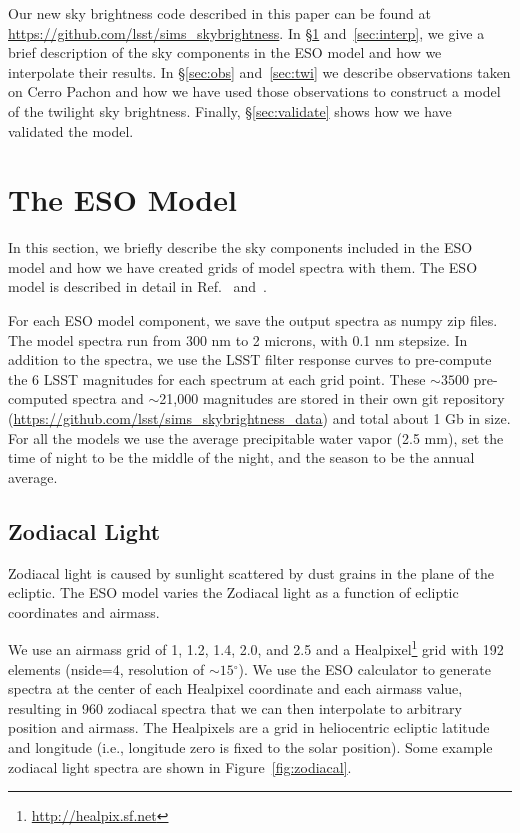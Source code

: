 \documentclass[]{spie}
\newcommand\degree{{^\circ}}
\begin{document}
Our new sky brightness code described in this paper can be found at \url{https://github.com/lsst/sims\_skybrightness}. In \S\ref{sec:eso} and~\ref{sec:interp}, we give a brief description of the sky components in the ESO model and how we interpolate their results. In \S\ref{sec:obs} and~\ref{sec:twi} we describe observations taken on Cerro Pachon and how we have used those observations to construct a model of the twilight sky brightness.  Finally, \S\ref{sec:validate} shows how we have validated the model.

\section{The ESO Model}\label{sec:eso}

In this section, we briefly describe the sky components included in the ESO model and how we have created grids of model spectra with them. The ESO model is described in detail in Ref.~ and~.

For each ESO model component, we save the output spectra as numpy zip files.  The model spectra run from 300 nm to 2 microns, with 0.1 nm stepsize.  In addition to the spectra, we use the LSST filter response curves to pre-compute the 6 LSST magnitudes for each spectrum at each grid point. These $\sim3500$ pre-computed spectra and $\sim$21,000 magnitudes are stored in their own git repository (\url{https://github.com/lsst/sims\_skybrightness\_data}) and total about 1 Gb in size. For all the models we use the average precipitable water vapor (2.5 mm), set the time of night to be the middle of the night, and the season to be the annual average.

\subsection{Zodiacal Light}

Zodiacal light is caused by sunlight scattered by dust grains in the plane of the ecliptic.  The ESO model varies the Zodiacal light as a function of ecliptic coordinates and airmass.  

We use an airmass grid of 1, 1.2, 1.4, 2.0, and 2.5 and a Healpixel\footnote{\url{http://healpix.sf.net}} \cite{Gorski99} grid with 192 elements (nside=4, resolution of $\sim15\degree$).  We use the ESO calculator to generate spectra at the center of each Healpixel coordinate and each airmass value, resulting in 960 zodiacal spectra that we can then interpolate to arbitrary position and airmass.  The Healpixels are a grid in heliocentric ecliptic latitude and longitude (i.e., longitude zero is fixed to the solar position).  Some example zodiacal light spectra are shown in Figure~\ref{fig:zodiacal}. 
\end{document}
